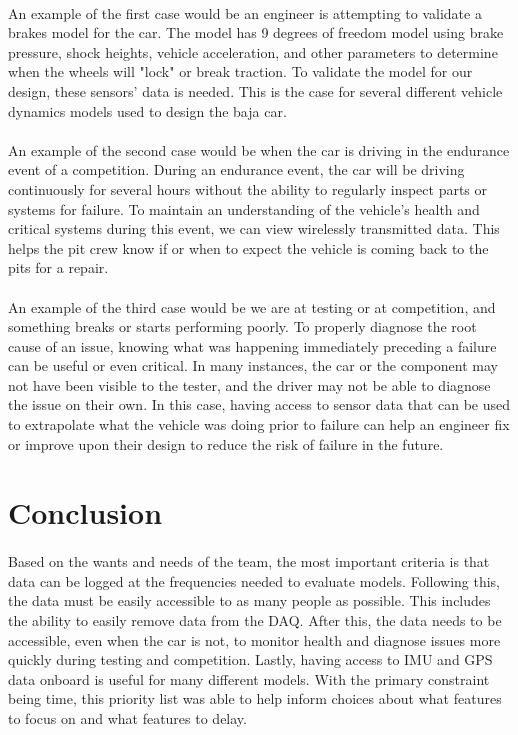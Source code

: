 \paragraph{}
An example of the first case would be an engineer is attempting to validate a brakes model for the car.
The model has 9 degrees of freedom model using brake pressure, shock heights, vehicle acceleration, and other parameters to determine when the wheels will "lock" or break traction.
To validate the model for our design, these sensors' data is needed.
This is the case for several different vehicle dynamics models used to design the baja car.

\paragraph{}
An example of the second case would be when the car is driving in the endurance event of a competition.
During an endurance event, the car will be driving continuously for several hours without the ability to regularly inspect parts or systems for failure.
To maintain an understanding of the vehicle's health and critical systems during this event, we can view wirelessly transmitted data.
This helps the pit crew know if or when to expect the vehicle is coming back to the pits for a repair.

\paragraph{}
An example of the third case would be we are at testing or at competition, and something breaks or starts performing poorly.
To properly diagnose the root cause of an issue, knowing what was happening immediately preceding a failure can be useful or even critical.
In many instances, the car or the component may not have been visible to the tester, and the driver may not be able to diagnose the issue on their own.
In this case, having access to sensor data that can be used to extrapolate what the vehicle was doing prior to failure can help an engineer fix or improve upon their design to reduce the risk of failure in the future.

\section{Conclusion}

\paragraph{}
Based on the wants and needs of the team, the most important criteria is that data can be logged at the frequencies needed to evaluate models.
Following this, the data must be easily accessible to as many people as possible.
This includes the ability to easily remove data from the DAQ.
After this, the data needs to be accessible, even when the car is not, to monitor health and diagnose issues more quickly during testing and competition.
Lastly, having access to IMU and GPS data onboard is useful for many different models.
With the primary constraint being time, this priority list was able to help inform choices about what features to focus on and what features to delay.